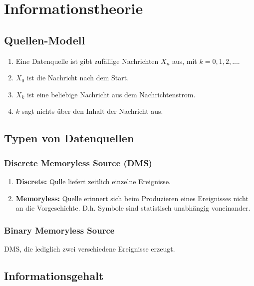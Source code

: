 \section{Informationstheorie}

\subsection{Quellen-Modell}%
\label{sub:quellen_modell}
\begin{enumerate}
	\item Eine Datenquelle ist gibt zufällige Nachrichten $X_n$ aus, mit $k=0,1,2,...$.
	\item $X_0$ ist die Nachricht nach dem Start.
	\item $X_k$ ist eine beliebige Nachricht aus dem Nachrichtenstrom.
	\item $k$ sagt nichts über den Inhalt der Nachricht aus.
\end{enumerate}

\subsection{Typen von Datenquellen}%
\label{sub:typen_von_datenquellen}
\subsubsection{Discrete Memoryless Source (DMS)}%
\label{ssub:discrete_memoryless_source_dms_}
\begin{enumerate}
	\item \textbf{Discrete:} Qulle liefert zeitlich einzelne Ereignisse.
	\item \textbf{Memoryless: } Quelle erinnert sich beim Produzieren eines Ereignisses nicht an
		die Vorgeschichte. D.h. Symbole sind statistisch unabhängig voneinander.
\end{enumerate}
\subsubsection{Binary Memoryless Source}%
\label{ssub:binary_memoryless_source}
	DMS, die lediglich zwei verschiedene Ereignisse erzeugt.

\subsection{Informationsgehalt}%
\label{sub:informationsgehalt}
